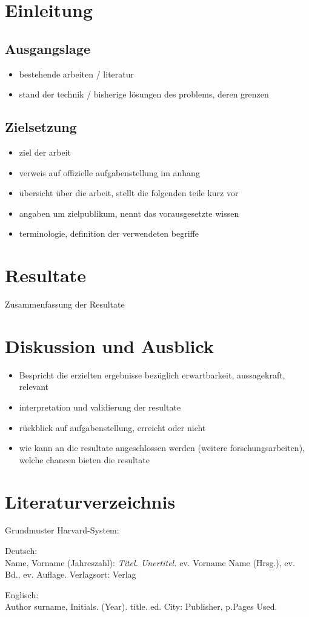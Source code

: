 \documentclass[11pt,a4paper,titlepage]{article}
\begin{document}
\tableofcontents

\section{Einleitung}
\subsection{Ausgangslage}
\begin{itemize}
\item bestehende arbeiten / literatur
\item stand der technik / bisherige lösungen des problems, deren grenzen
\end{itemize}

\subsection{Zielsetzung}
\begin{itemize}
\item ziel der arbeit
\item verweis auf offizielle aufgabenstellung im anhang
\item übersicht über die arbeit, stellt die folgenden teile kurz vor
\item angaben um zielpublikum, nennt das vorausgesetzte wissen
\item terminologie, definition der verwendeten begriffe
\end{itemize}

\section{Resultate}
Zusammenfassung der Resultate

\section{Diskussion und Ausblick}
\begin{itemize}
\item Bespricht die erzielten ergebnisse bezüglich erwartbarkeit, aussagekraft, relevant
\item interpretation und validierung der resultate
\item rückblick auf aufgabenstellung, erreicht oder nicht
\item wie kann an die resultate angeschlossen werden (weitere forschungsarbeiten), welche chancen bieten die resultate
\end{itemize}

\section{Literaturverzeichnis}
Grundmuster Harvard-System:

Deutsch:\\
Name, Vorname (Jahreszahl): \textit{Titel. Unertitel.} ev. Vorname Name (Hrsg.), ev. Bd., ev. Auflage. Verlagsort: Verlag 

Englisch:\\
Author surname, Initials. (Year). title. ed. City: Publisher, p.Pages Used.
\end{document}
